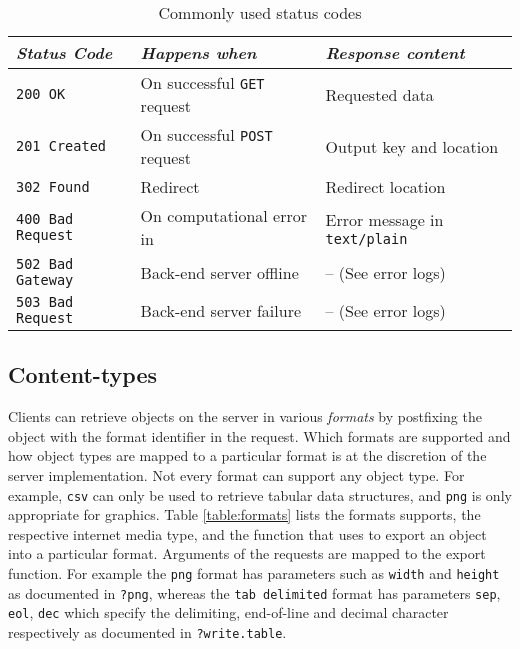 \begin{table}[H]
\centering
\def\arraystretch{1.3}%
\begin{tabular}{@{}lll@{}}
\toprule
\emph{Status Code}              & \emph{Happens when}                             & \emph{Response content}                     \\ \midrule
\texttt{200 OK}          & On successful \texttt{GET} request                     & Requested data                    \\
\texttt{201 Created}     & On successful \texttt{POST} request                    & Output key and location                     \\
\texttt{302 Found}       & Redirect                                               & Redirect location                   \\
\texttt{400 Bad Request} & On computational error in \R                                     & Error message in \texttt{text/plain} \\
\texttt{502 Bad Gateway} & Back-end server offline                            & -- (See error logs) \\
\texttt{503 Bad Request} & Back-end server failure                                & -- (See error logs) \\ \bottomrule                          
\end{tabular}
\caption{Commonly used \HTTP status codes}
\label{table:statuscodes}
\end{table}

\subsection{Content-types}

Clients can retrieve objects on the server in various \emph{formats} by postfixing the object \URL with the format identifier in the \GET request. Which formats are supported and how object types are mapped to a particular format is at the discretion of the server implementation. Not every format can support any object type. For example, \texttt{csv} can only be used to retrieve tabular data structures, and \texttt{png} is only appropriate for graphics. Table \ref{table:formats} lists the formats \OpenCPU supports, the respective internet media type, and the \R function that \OpenCPU uses to export an object into a particular format. Arguments of the \GET requests are mapped to the export function. For example the \texttt{png} format has parameters such as \texttt{width} and \texttt{height} as documented in \texttt{?png}, whereas the \texttt{tab delimited} format has parameters \texttt{sep}, \texttt{eol}, \texttt{dec} which specify the delimiting, end-of-line and decimal character respectively as documented in \texttt{?write.table}.

